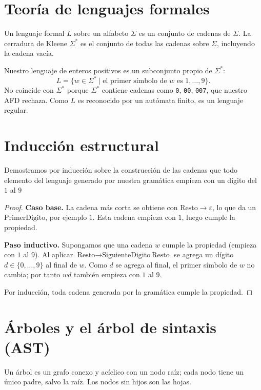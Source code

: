 \documentclass[10pt,a4paper]{article}
\theoremstyle{definition}
\begin{document}
\section{Teoría de lenguajes formales}

Un lenguaje formal $L$ sobre un alfabeto $\Sigma$ es un conjunto de cadenas de $\Sigma$.
La cerradura de Kleene $\Sigma^*$ es el conjunto de todas las cadenas sobre $\Sigma$,
incluyendo la cadena vacía.

Nuestro lenguaje de enteros positivos es un subconjunto propio de
$\Sigma^*$:
\[
    L = \{ w \in \Sigma^* \mid \text{el primer símbolo de } w \text{ es } 1,\dots,9 \}.
\]
No coincide con $\Sigma^*$ porque $\Sigma^*$ contiene cadenas como \texttt{0}, \texttt{00}, \texttt{007}, que nuestro AFD rechaza.
Como $L$ es reconocido por un autómata finito, es un lenguaje regular.

\section{Inducción estructural}

Demostramos por inducción sobre la construcción de las cadenas
que todo elemento del lenguaje generado por nuestra gramática empieza 
con un dígito del $1$ al $9$

\begin{proof}
    \textbf{Caso base.} La cadena más corta se obtiene con
    $\text{Resto} \to \varepsilon$, lo que da un $\text{PrimerDigito}$,
    por ejemplo $1$. Esta cadena empieza con $1$, luego cumple la propiedad.

    \textbf{Paso inductivo.} Supongamos que una cadena $w$ cumple la propiedad (empieza con $1$ al $9$).
    Al aplicar $\text{Resto} \to \text{SiguienteDigito}\ \text{Resto}$ se agrega
    un dígito $d \in \{0,\dots,9\}$ al final de $w$. Como $d$ se agrega al final,
    el primer símbolo de $w$ no cambia; por tanto $wd$ también empieza con $1$ al $9$.
    
    Por inducción, toda cadena generada por la gramática cumple la propiedad.
\end{proof}

\section{Árboles y el árbol de sintaxis (AST)}

Un árbol es un grafo conexo y acíclico con un nodo raíz; cada nodo tiene un único
padre, salvo la raíz. Los nodos sin hijos son las hojas.
\end{document}
